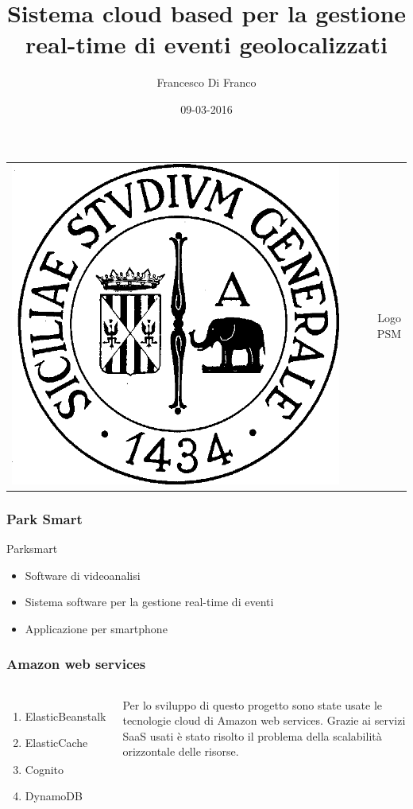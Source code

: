 \documentclass{beamer}
\title[Relazione progetto finale]{Sistema cloud based per la gestione real-time di eventi geolocalizzati}
\author{Francesco Di Franco} %
\institute[UniCT] 
{
Univerist\`a degli studi di Catania \\ %
\medskip
\textit{} 
}
\date{09-03-2016}
\begin{document}
\begin{frame}
\begin{table}[]
\centering
\begin{tabular}{lcr}

\includegraphics[scale=0.15]{../img/logo_unict.png}
&  &  Logo PSM\\ 
\end{tabular}
\end{table}
\titlepage
\end{frame}


\begin{frame}
\frametitle{Park Smart}
Parksmart 
\begin{itemize}
\item Software di videoanalisi
\item Sistema software per la gestione real-time di eventi
\item Applicazione per smartphone
\end{itemize}
\end{frame}


\begin{frame}
\frametitle{Amazon web services}
\begin{columns}[c] 


\begin{enumerate}
\item ElasticBeanstalk
\item ElasticCache
\item Cognito
\item DynamoDB
\end{enumerate}

Per lo sviluppo di questo progetto sono state usate le tecnologie cloud di Amazon web services. Grazie ai servizi SaaS usati \`e stato risolto il problema della scalabilit\`a orizzontale delle risorse.

\end{columns}
\end{frame}
\end{document}

